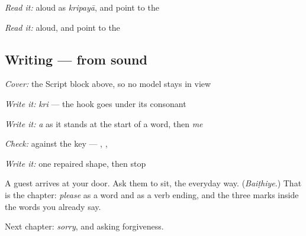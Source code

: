 \emph{Read it:} \textbf{} aloud as \emph{kripayā}, and point to the 

\emph{Read it:} \textbf{} aloud, and point to the 

\subsection*{Writing — from sound}
\emph{Cover:} the Script block above, so no model stays in view

\emph{Write it:} \emph{kri} — the hook goes under its consonant

\emph{Write it:} \emph{a} as it stands at the start of a word, then \emph{me}

\emph{Check:} against the key — \textbf{}, \textbf{}, \textbf{}

\emph{Write it:} one repaired shape, then stop

\begin{tcolorbox}[breakable,colback=teal!4,colframe=teal!35!black,title={Before you move on}]
A guest arrives at your door. Ask them to sit, the everyday way. (\emph{Baiṭhiye}.) That is the chapter: \emph{please} as a word and as a verb ending, and the three marks inside the words you already say.

Next chapter: \emph{sorry}, and asking forgiveness.
\end{tcolorbox}
